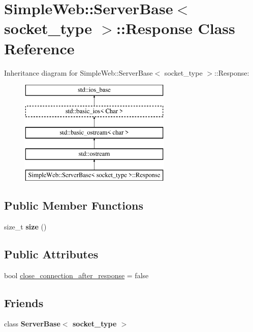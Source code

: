 \hypertarget{a00251}{}\section{Simple\+Web\+:\+:Server\+Base$<$ socket\+\_\+type $>$\+:\+:Response Class Reference}
\label{a00251}
Inheritance diagram for Simple\+Web\+:\+:Server\+Base$<$ socket\+\_\+type $>$\+:\+:Response\+:\begin{figure}[H]
\begin{center}
\leavevmode
\includegraphics[height=5.000000cm]{a00251}
\end{center}
\end{figure}
\subsection*{Public Member Functions}
\begin{DoxyCompactItemize}
\item 
size\+\_\+t {\bfseries size} ()\hypertarget{a00251_af666efb61621d70c16e3d6a6c419271d}{}\label{a00251_af666efb61621d70c16e3d6a6c419271d}

\end{DoxyCompactItemize}
\subsection*{Public Attributes}
\begin{DoxyCompactItemize}
\item 
bool \hyperlink{a00251_a2818b4f3c577ff1f4067bb1c62640c15}{close\+\_\+connection\+\_\+after\+\_\+response} = false
\end{DoxyCompactItemize}
\subsection*{Friends}
\begin{DoxyCompactItemize}
\item 
class {\bfseries Server\+Base$<$ socket\+\_\+type $>$}\hypertarget{a00251_a01d54a7e16ca437c98ec571deca98dfc}{}\label{a00251_a01d54a7e16ca437c98ec571deca98dfc}

\end{DoxyCompactItemize}


